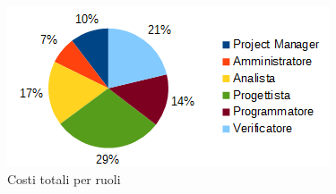 		\begin{figure}[H]
			\centering
			\includegraphics[width=1\linewidth]{immagini/grafici/riepilogo_conclusivo-torta-costo.png}
			\caption{Costi totali per ruoli}
		\end{figure}

